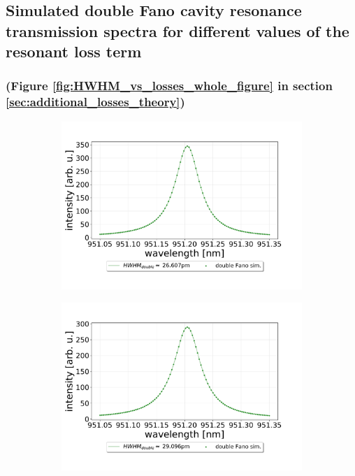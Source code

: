\clearpage
\subsection{Simulated double Fano cavity resonance transmission spectra for different values of the resonant loss term}

\subsubsection*{(Figure \ref{fig:HWHM_vs_losses_whole_figure} in section \ref{sec:additional_losses_theory})}

\begin{figure}[h!]
    \centering
    \begin{subfigure}[b]{0.49\textwidth}
        \includegraphics[width=\textwidth]{figures/double_1percent_loss_30um.pdf}
        \caption{}
        \label{fig:1_percent_loss}
    \end{subfigure}
    \begin{subfigure}[b]{0.49\textwidth}
        \includegraphics[width=\textwidth]{figures/double_2percent_loss_30um.pdf}

\end{subfigure}
\end{figure}
